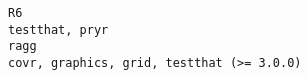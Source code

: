\documentclass[
  letterpaper,
  DIV=11,
  numbers=noendperiod]{scrreprt}
\begin{document}
\begin{verbatim}
R6                                                                                                                                                                                                                                                                                                                                                                                                                                                                                                                                                                                                                                                                                                                                                                                                                                                                                                                                                                                                                                                                                                                                                                                                                                                                                             testthat, pryr
ragg                                                                                                                                                                                                                                                                                                                                                                                                                                                                                                                                                                                                                                                                                                                                                                                                                                                                                                                                                                                                                                                                                                                                                                                                                                                                covr, graphics, grid, testthat (>= 3.0.0)

\end{verbatim}
\end{document}
